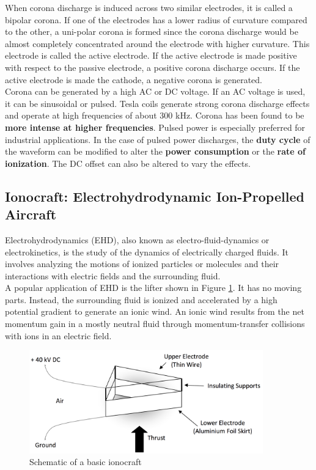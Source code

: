 \documentclass[11pt]{article}
\begin{document}
When corona discharge is induced across two similar electrodes, it is called a bipolar corona. If one of the electrodes has a lower radius of curvature compared to the other, a uni-polar corona is formed since the corona discharge would be almost completely concentrated around the electrode with higher curvature. This electrode is called the active electrode. If the active electrode is made positive with respect to the passive electrode, a positive corona discharge occurs. If the active electrode is made the cathode, a negative corona is generated.\\

Corona can be generated by a high AC or DC voltage. If an AC voltage is used, it can be sinusoidal or pulsed. Tesla coils generate strong corona discharge effects and operate at high frequencies of about 300 kHz. Corona has been found to be \textbf{more intense at higher frequencies}. Pulsed power is especially preferred for industrial applications. In the case of pulsed power discharges, the \textbf{duty cycle} of the waveform can be modified to alter the \textbf{power consumption} or the \textbf{rate of ionization}. The DC offset can also be altered to vary the effects.



\subsection{Ionocraft: Electrohydrodynamic Ion-Propelled Aircraft}
\label{ehd_ionocraft}

Electrohydrodynamics (EHD), also known as electro-fluid-dynamics or electrokinetics, is the study of the dynamics of electrically charged fluids. It involves analyzing the motions of ionized particles or molecules and their interactions with electric fields and the surrounding fluid.\\

A popular application of EHD is the lifter shown in Figure \ref{fig:lifter}. It has no moving parts. Instead, the surrounding fluid is ionized and accelerated by a high potential gradient to generate an ionic wind. An ionic wind results from the net momentum gain in a mostly neutral fluid through momentum-transfer collisions with ions in an electric field.\\

\begin{figure}[h!]
\centering
\includegraphics[width= 0.9\textwidth]{lifter}
\caption{\label{fig:lifter} Schematic of a basic ionocraft \cite{ehdperform}}
\end{figure}
\end{document}
